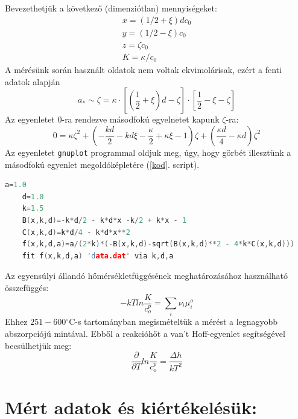 \documentclass[20pt]{article}
\numberwithin{equation}{section}
\numberwithin{figure}{section}
\numberwithin{table}{section}
\begin{document}
	Bevezethetjük a következő (dimenziótlan) mennyiségeket:
	\begin{equation}\label{eq:xyz}
	\begin{matrix}
	x = \left( 1/2 + \xi \right) d c_0\\
	y = \left( 1/2 - \xi \right)c_0\\
	z  =\zeta c_0\\
	K = \kappa/c_0
	\end{matrix}
	\end{equation}
	A mérésünk során használt oldatok nem voltak ekvimolárisak, ezért a fenti adatok alapján
	\begin{equation}\label{eq:kappazeta}
	a_* \sim \zeta = \kappa \cdot \left[ \left( \frac{1}{2} + \xi \right) d - \zeta \right] \cdot \left[\frac{1}{2} - \xi - \zeta \right]
	\end{equation}
	Az egyenletet 0-ra rendezve másodfokú egyelnetet kapunk $\zeta$-ra:
	\begin{equation}\label{eq:masodfoku}
	0 = \kappa \zeta^2 + \left( - \frac{kd}{2} - kd\xi - \frac{\kappa}{2} + \kappa \xi -1\right) \zeta + \left( \frac{\kappa d}{4} - \kappa d \right) \zeta ^2
	\end{equation}
	Az egyenletet \texttt{gnuplot} programmal oldjuk meg, úgy, hogy görbét illesztünk a másodfokú egyenlet megoldóképletére (\ref{kod}. script).
	
	\begin{lstlisting}[language=c++, label=kod, caption= A másodfokú egyenletet illesztéssel megoldó \texttt{gnuplot} script.]
	a=1.0
	d=1.0
	k=1.5
	B(x,k,d)=-k*d/2 - k*d*x -k/2 + k*x - 1
	C(x,k,d)=k*d/4 - k*d*x**2
	f(x,k,d,a)=a/(2*k)*(-B(x,k,d)-sqrt(B(x,k,d)**2 - 4*k*C(x,k,d)))
	fit f(x,k,d,a) 'data.dat' via k,d,a\end{lstlisting}
	Az egyensúlyi állandó hőmérsékletfüggésének meghatározásához használható összefüggés:
	\begin{equation}
	-kTln\frac{K}{c_{o}^{p}}=\sum_{i}\nu_{i}\mu_{i}^{o}
	\end{equation}
	Ehhez $251-600^\circ$C-s tartományban megismételtük a mérést a legnagyobb abszorpciójú mintával. Ebből a reakcióhőt a van't Hoff-egyenlet segítségével becsülhetjük meg:
	\begin{equation}
	\frac{\partial}{\partial T}ln\frac{K}{c_{o}^{p}}=\frac{\Delta h}{kT^{2}}
	\end{equation}
	
	\section{Mért adatok és kiértékelésük:}
\end{document}
